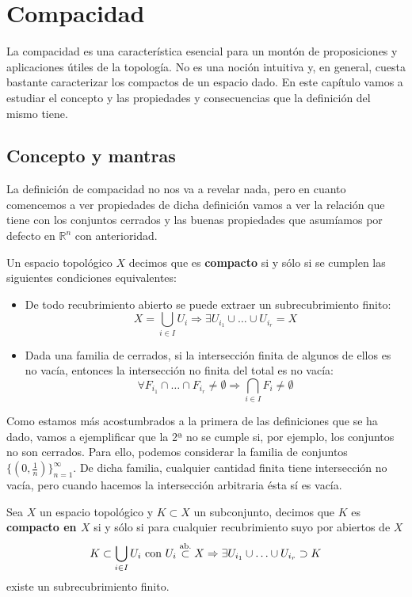 \chapter{Compacidad}%
\label{cha:compacidad}
La compacidad es una característica esencial para un montón de proposiciones y aplicaciones útiles de la topología. No es una noción intuitiva y, en general, cuesta bastante caracterizar los compactos de un espacio dado. En este capítulo vamos a estudiar el concepto y las propiedades y consecuencias que la definición del mismo tiene.

\section{Concepto y mantras}%
\label{sec:concepto_y_mantras_comp}
La definición de compacidad no nos va a revelar nada, pero en cuanto comencemos a ver propiedades de dicha definición vamos a ver la relación que tiene con los conjuntos cerrados y las buenas propiedades que asumíamos por defecto en $\mathbb{R}^n$ con anterioridad.

\begin{defi}[Compacidad]
Un espacio topológico $X$ decimos que es \textbf{compacto} si y sólo si se cumplen las siguientes condiciones equivalentes:
\begin{itemize}
\item De todo recubrimiento abierto se puede extraer un subrecubrimiento finito:
\[
X = \bigcup_{i \in  I} U_i \Rightarrow \exists U_{i_1} \cup \ldots \cup U_{i_r} = X
\]
\item Dada una familia de cerrados, si la intersección finita de algunos de ellos es no vacía, entonces la intersección no finita del total es no vacía:
\[
\forall F_{i_1} \cap \ldots \cap F_{i_r} \neq \emptyset \Rightarrow \bigcap_{i \in  I} F_i \neq \emptyset
\]
\end{itemize}
\end{defi}

\begin{ej}
Como estamos más acostumbrados a la primera de las definiciones que se ha dado, vamos a ejemplificar que la 2ª no se cumple si, por ejemplo, los conjuntos no son cerrados. Para ello, podemos considerar la familia de conjuntos $\{\left( 0, \frac{1}{n} \right)\}_{n = 1}^\infty$. De dicha familia, cualquier cantidad finita tiene intersección no vacía, pero cuando hacemos la intersección arbitraria ésta sí es vacía.
\end{ej}

\begin{defi}
Sea $X$ un espacio topológico y $K \subset X$ un subconjunto, decimos que $K$ es \textbf{compacto en $X$} si y sólo si para cualquier recubrimiento suyo por abiertos de $X$
\[
K \subset \bigcup_{i \in  I} U_i \text{ con } U_i \stackrel{\text{ab.}}{\subset} X \Rightarrow \exists U_{i_1} \cup \ldots \cup U_{i_r} \supset K
\]
existe un subrecubrimiento finito.
\end{defi}

